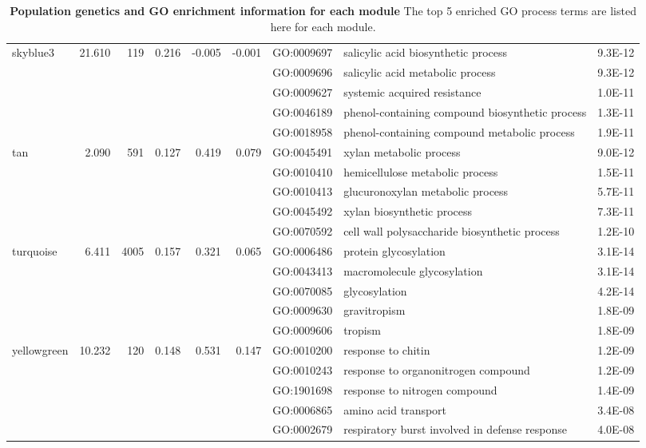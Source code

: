 \begin{landscape}
\begin{table}[ht]
\begin{tabular}{|l|rrrrrlP{5cm}r|}
skyblue3 & 21.610 & 119 & 0.216 & -0.005 & -0.001 & GO:0009697 & salicylic acid biosynthetic process & 9.3E-12 \\ 
   &  &  &  &  &  & GO:0009696 & salicylic acid metabolic process & 9.3E-12 \\ 
   &  &  &  &  &  & GO:0009627 & systemic acquired resistance & 1.0E-11 \\ 
   &  &  &  &  &  & GO:0046189 & phenol-containing compound biosynthetic process & 1.3E-11 \\ 
   &  &  &  &  &  & GO:0018958 & phenol-containing compound metabolic process & 1.9E-11 \\ 
\hline 
 tan & 2.090 & 591 & 0.127 & 0.419 & 0.079 & GO:0045491 & xylan metabolic process & 9.0E-12 \\ 
   &  &  &  &  &  & GO:0010410 & hemicellulose metabolic process & 1.5E-11 \\ 
   &  &  &  &  &  & GO:0010413 & glucuronoxylan metabolic process & 5.7E-11 \\ 
   &  &  &  &  &  & GO:0045492 & xylan biosynthetic process & 7.3E-11 \\ 
   &  &  &  &  &  & GO:0070592 & cell wall polysaccharide biosynthetic process & 1.2E-10 \\ 
\hline  
turquoise & 6.411 & 4005 & 0.157 & 0.321 & 0.065 & GO:0006486 & protein glycosylation & 3.1E-14 \\ 
   &  &  &  &  &  & GO:0043413 & macromolecule glycosylation & 3.1E-14 \\ 
   &  &  &  &  &  & GO:0070085 & glycosylation & 4.2E-14 \\ 
   &  &  &  &  &  & GO:0009630 & gravitropism & 1.8E-09 \\ 
   &  &  &  &  &  & GO:0009606 & tropism & 1.8E-09 \\ 
\hline 
 yellowgreen & 10.232 & 120 & 0.148 & 0.531 & 0.147 & GO:0010200 & response to chitin & 1.2E-09 \\ 
   &  &  &  &  &  & GO:0010243 & response to organonitrogen compound & 1.2E-09 \\ 
   &  &  &  &  &  & GO:1901698 & response to nitrogen compound & 1.4E-09 \\ 
   &  &  &  &  &  & GO:0006865 & amino acid transport & 3.4E-08 \\ 
   &  &  &  &  &  & GO:0002679 & respiratory burst involved in defense response & 4.0E-08 \\ 
   \hline
\end{tabular}
\caption{\textbf{Population genetics and GO enrichment information for each module} The top 5 enriched GO process terms are listed here for each module.}
\label{table:t1}
\end{table}

\end{landscape}

